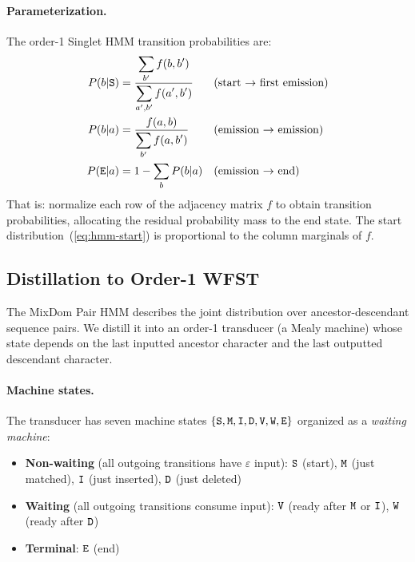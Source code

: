\paragraph{Parameterization.}
The order-1 Singlet HMM transition probabilities are:
\begin{align}
P(b | {\tt S}) &= \frac{\displaystyle\sum_{b'} f(b,b')}{\displaystyle\sum_{a',b'} f(a',b')}
&& \mbox{(start $\to$ first emission)} \label{eq:hmm-start} \\
P(b | a) &= \frac{f(a,b)}{\displaystyle\sum_{b'} f(a,b')}
&& \mbox{(emission $\to$ emission)} \label{eq:hmm-trans} \\
P({\tt E} | a) &= 1 - \sum_{b} P(b | a)
&& \mbox{(emission $\to$ end)} \label{eq:hmm-end}
\end{align}
That is: normalize each row of the adjacency matrix $f$ to obtain transition probabilities,
allocating the residual probability mass to the end state.
The start distribution~(\ref{eq:hmm-start}) is proportional to the column marginals of $f$.


\subsection{Distillation to Order-1 WFST}

\label{sec:order1trans}

The MixDom Pair HMM describes the joint distribution over ancestor-descendant sequence pairs.
We distill it into an order-1 transducer (a Mealy machine)
whose state depends on the last inputted ancestor character
and the last outputted descendant character.

\paragraph{Machine states.}
The transducer has seven machine states $\{{\tt S},{\tt M},{\tt I},{\tt D},{\tt V},{\tt W},{\tt E}\}$
organized as a \emph{waiting machine}:
\begin{itemize}
\item \textbf{Non-waiting} (all outgoing transitions have $\varepsilon$ input):
  ${\tt S}$ (start), ${\tt M}$ (just matched), ${\tt I}$ (just inserted), ${\tt D}$ (just deleted)
\item \textbf{Waiting} (all outgoing transitions consume input):
  ${\tt V}$ (ready after ${\tt M}$ or ${\tt I}$), ${\tt W}$ (ready after ${\tt D}$)
\item \textbf{Terminal}: ${\tt E}$ (end)
\end{itemize}

